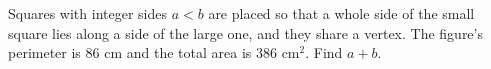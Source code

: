 Squares with integer sides $a<b$ are placed so that a whole side of the small square lies along a side of the large one, and they share a vertex. The figure's perimeter is $86$ cm and the total area is $386$ cm$^2$. Find $a+b$.
